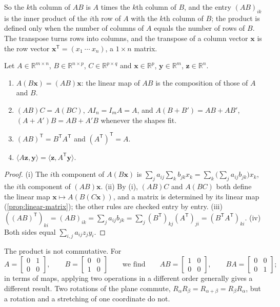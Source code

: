 So the $k$th column of $AB$ is $A$ times the $k$th column of $B$, and the entry $(AB)_{ik}$ is the inner product of the $i$th row of $A$ with the $k$th column of $B$; the product is defined only when the number of columns of $A$ equals the number of rows of $B$. The transpose turns rows into columns, and the transpose of a column vector $\mathbf x$ is the row vector $\mathbf x^{\mathsf T}=(x_1\ \cdots\ x_n)$, a $1\times n$ matrix.

\begin{proposition}
\label{prop:matrix-algebra}
Let $A\in\mathbb R^{m\times n}$, $B\in\mathbb R^{n\times p}$, $C\in\mathbb R^{p\times q}$ and $\mathbf x\in\mathbb R^p$, $\mathbf y\in\mathbb R^m$, $\mathbf z\in\mathbb R^n$.
\begin{enumerate}
\item $A(B\mathbf x)=(AB)\mathbf x$: the linear map of $AB$ is the composition of those of $A$ and $B$.
\item $(AB)C=A(BC)$, $AI_n=I_mA=A$, and $A(B+B')=AB+AB'$, $(A+A')B=AB+A'B$ whenever the shapes fit.
\item $(AB)^{\mathsf T}=B^{\mathsf T}A^{\mathsf T}$ and $(A^{\mathsf T})^{\mathsf T}=A$.
\item $\langle A\mathbf z,\mathbf y\rangle=\langle\mathbf z,A^{\mathsf T}\mathbf y\rangle$.
\end{enumerate}
\end{proposition}

\begin{proof}
(i) The $i$th component of $A(B\mathbf x)$ is $\sum_ja_{ij}\sum_kb_{jk}x_k=\sum_k\bigl(\sum_ja_{ij}b_{jk}\bigr)x_k$, the $i$th component of $(AB)\mathbf x$. (ii) By (i), $(AB)C$ and $A(BC)$ both define the linear map $\mathbf x\mapsto A(B(C\mathbf x))$, and a matrix is determined by its linear map (\cref{prop:linear-matrix}); the other rules are checked entry by entry. (iii) $((AB)^{\mathsf T})_{ki}=(AB)_{ik}=\sum_ja_{ij}b_{jk}=\sum_j(B^{\mathsf T})_{kj}(A^{\mathsf T})_{ji}=(B^{\mathsf T}A^{\mathsf T})_{ki}$. (iv) Both sides equal $\sum_{i,j}a_{ij}z_jy_i$.
\end{proof}

The product is not commutative. For
\[
A=\begin{bmatrix}0&1\\0&0\end{bmatrix},\qquad B=\begin{bmatrix}0&0\\1&0\end{bmatrix}\qquad\text{we find}\qquad AB=\begin{bmatrix}1&0\\0&0\end{bmatrix},\qquad BA=\begin{bmatrix}0&0\\0&1\end{bmatrix};
\]
in terms of maps, applying two operations in a different order generally gives a different result. Two rotations of the plane commute, $R_\alpha R_\beta=R_{\alpha+\beta}=R_\beta R_\alpha$, but a rotation and a stretching of one coordinate do not.

